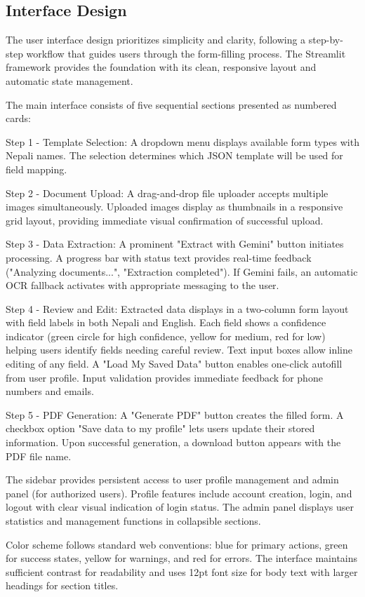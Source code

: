 \documentclass[12pt]{report}
\begin{document}
\subsection{Interface Design}
The user interface design prioritizes simplicity and clarity, following a 
step-by-step workflow that guides users through the form-filling process. The 
Streamlit framework provides the foundation with its clean, responsive layout and automatic state management.

The main interface consists of five sequential sections presented as numbered cards:

Step 1 - Template Selection: A dropdown menu displays available form types with Nepali names. The selection determines which 
JSON template will be used for field mapping.

Step 2 - Document Upload: A drag-and-drop file uploader accepts multiple images simultaneously. Uploaded images display as thumbnails in a responsive grid layout, providing immediate visual confirmation of successful upload.

Step 3 - Data Extraction: A prominent "Extract with Gemini" button initiates 
processing. A progress bar with status text provides real-time feedback ("Analyzing documents...", "Extraction completed"). If Gemini fails, an automatic OCR fallback activates with appropriate messaging to the user.

Step 4 - Review and Edit: Extracted data displays in a two-column form layout with field labels in both Nepali and English. Each field shows a confidence indicator (green circle for high confidence, yellow for medium, red for low) helping users identify fields needing careful review. Text input boxes allow inline editing of any field. A "Load My Saved Data" button enables one-click autofill from user profile. Input validation provides immediate feedback for phone numbers and emails.

Step 5 - PDF Generation: A "Generate PDF" button creates the filled form. A 
checkbox option "Save data to my profile" lets users update their stored information. Upon successful generation, a download button appears with the PDF file name.

The sidebar provides persistent access to user profile management and admin panel (for authorized users). Profile features include account creation, login, and logout with clear visual indication of login status. The admin panel displays user statistics and management functions in collapsible sections.

Color scheme follows standard web conventions: blue for primary actions, green for success states, yellow for warnings, and red for errors. The interface maintains sufficient contrast for readability and uses 12pt font size for body text with larger headings for section titles.
\end{document}
